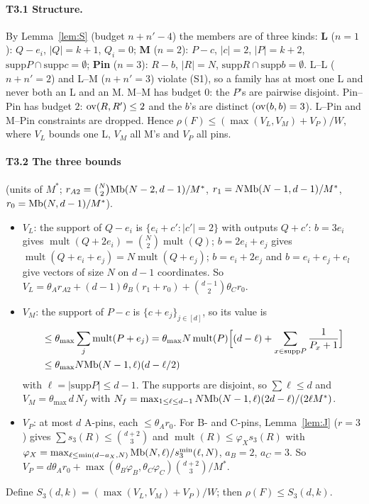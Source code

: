 \documentclass[11pt]{article}
\newcommand{\mult}{\operatorname{mult}}
\theoremstyle{definition}
\theoremstyle{remark}
\begin{document}
\paragraph{T3.1 Structure.} By Lemma~\ref{lem:S} (budget $n+n'-4$) the members are of three kinds: \textbf{L} ($n=1$): $Q-e_i$, $|Q|=k+1$, $Q_i=0$;
\textbf{M} ($n=2$): $P-c$, $|c|=2$, $|P|=k+2$, $\mathrm{supp}P\cap\mathrm{supp}c=\emptyset$; \textbf{Pin} ($n=3$): $R-b$, $|R|=N$,
$\mathrm{supp}R\cap\mathrm{supp}b=\emptyset$. L--L ($n+n'=2$) and L--M ($n+n'=3$) violate (S1), so a family has at most one L and never both an L and
an M. M--M has budget $0$: the $P$'s are pairwise disjoint. Pin--Pin has budget $2$: $\mathrm{ov}(R,R')\le2$ and the $b$'s are distinct ($\mathrm{ov}(b,b)=3$).
L--Pin and M--Pin constraints are dropped. Hence $\rho(F)\le(\max(V_L,V_M)+V_P)/W$, where $V_L$ bounds one L, $V_M$ all M's and $V_P$ all
pins.

\paragraph{T3.2 The three bounds} (units of $M^\ast$; $r_{A2}=\binom N2\mathrm{Mb}(N-2,d-1)/M^\ast$, $r_1=N\mathrm{Mb}(N-1,d-1)/M^\ast$, $r_0=\mathrm{Mb}(N,d-1)/M^\ast$).
\begin{itemize}
\item $V_L$: the support of $Q-e_i$ is $\{e_i+c':|c'|=2\}$ with outputs $Q+c'$: $b=3e_i$ gives $\mult(Q+2e_i)=\binom N2\mult(Q)$; $b=2e_i+e_j$ gives
$\mult(Q+e_i+e_j)=N\mult(Q+e_j)$; $b=e_i+2e_j$ and $b=e_i+e_j+e_l$ give vectors of size $N$ on $d-1$ coordinates. So
$V_L=\theta_Ar_{A2}+(d-1)\theta_B(r_1+r_0)+\binom{d-1}2\theta_Cr_0$.
\item $V_M$: the support of $P-c$ is $\{c+e_j\}_{j\in[d]}$, so its value is
\begin{align*}&\le\theta_{\max}\sum_j\mult(P+e_j)=\theta_{\max}N\mult(P)\Big[(d-\ell)+\sum_{x\in\mathrm{supp}P}\frac1{P_x+1}\Big]\\
&\le\theta_{\max}N\Mb(N-1,\ell)(d-\ell/2)\end{align*}
with $\ell=|\mathrm{supp}P|\le d-1$. The supports are disjoint, so $\sum\ell\le d$ and
$V_M=\theta_{\max}\,d\,N_f$ with $N_f=\max_{1\le\ell\le d-1}N\mathrm{Mb}(N-1,\ell)(2d-\ell)/(2\ell M^\ast)$.
\item $V_P$: at most $d$ A-pins, each $\le\theta_Ar_0$. For B- and C-pins, Lemma~\ref{lem:J} ($r=3$) gives $\sum s_3(R)\le\binom{d+2}3$ and
$\mult(R)\le\varphi_Xs_3(R)$ with $\varphi_X=\max_{\ell\le\min(d-a_X,N)}\mathrm{Mb}(N,\ell)/s_3^{\min}(\ell,N)$, $a_B=2$, $a_C=3$. So
$V_P=d\theta_Ar_0+\max(\theta_B\varphi_B,\theta_C\varphi_C)\binom{d+2}3/M^\ast$.
\end{itemize}
Define $S_3(d,k)=(\max(V_L,V_M)+V_P)/W$; then $\rho(F)\le S_3(d,k)$.
\end{document}
